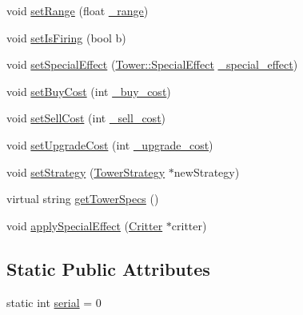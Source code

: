 \begin{DoxyCompactItemize}
void \hyperlink{class_tower_a867f4e6b1621fba50fcba5cd1d27f227}{set\+Range} (float \hyperlink{class_tower_a77cd5002dac75320f83fb540a3878936}{\+\_\+range})
\item 
void \hyperlink{class_tower_af1ca7002ff17d468f7b9b3b5e4f99348}{set\+Is\+Firing} (bool b)
\item 
void \hyperlink{class_tower_ac2b7becdd52924a8787cf7de2a62fff5}{set\+Special\+Effect} (\hyperlink{class_tower_a355ab1cbcfd8c4d037ccf8937f784445}{Tower\+::\+Special\+Effect} \hyperlink{class_tower_ad6a84071c2e7f48386443c469961116c}{\+\_\+special\+\_\+effect})
\item 
void \hyperlink{class_tower_ad103dd810daf5865560a9a8df0e9a783}{set\+Buy\+Cost} (int \hyperlink{class_tower_a102680a58c45f98a79609ce8961a7bed}{\+\_\+buy\+\_\+cost})
\item 
void \hyperlink{class_tower_ade5f41558a0240b5596a017a23334336}{set\+Sell\+Cost} (int \hyperlink{class_tower_a7f50414500ec524ccc6ffb7069328d1e}{\+\_\+sell\+\_\+cost})
\item 
void \hyperlink{class_tower_af0366aa989249fc2d8254b967dd2f9aa}{set\+Upgrade\+Cost} (int \hyperlink{class_tower_ade771f89ab1aecb165efb74592e71261}{\+\_\+upgrade\+\_\+cost})
\item 
void \hyperlink{class_tower_aa5280191c23e7cd98e9a1d9cfaba3416}{set\+Strategy} (\hyperlink{class_tower_strategy}{Tower\+Strategy} $\ast$new\+Strategy)
\item 
virtual string \hyperlink{class_tower_a2427fab36824f8ec98273cb5e563e0c9}{get\+Tower\+Specs} ()
\item 
void \hyperlink{class_tower_a7df1e896cdd5cdf7cc2169d6d4f9a6cf}{apply\+Special\+Effect} (\hyperlink{class_critter}{Critter} $\ast$critter)
\end{DoxyCompactItemize}
\subsection*{Static Public Attributes}
\begin{DoxyCompactItemize}
\item 
static int \hyperlink{class_tower_a53001ebc47ba7e60fdb7eb1dcdd82a64}{serial} = 0
\end{DoxyCompactItemize}
